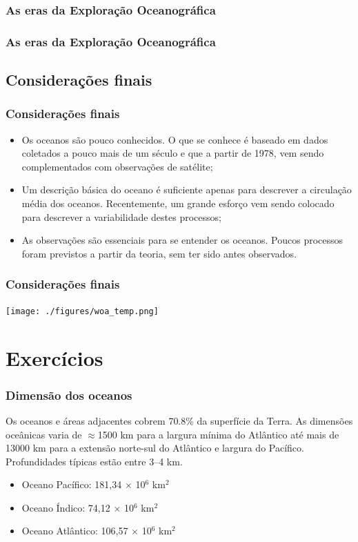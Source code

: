 \begin{frame}
    \frametitle{As eras da Exploração Oceanográfica}
    \centerline{}
\end{frame}

\begin{frame}
    \frametitle{As eras da Exploração Oceanográfica}
    \centerline{}
\end{frame}

\subsection{Considerações finais}
\begin{frame}
    \frametitle{Considerações finais}
\small{
    \begin{itemize}[<+-| alert@+>]
        \item Os oceanos são pouco conhecidos.  O que se conhece é baseado em
              dados coletados a pouco mais de um século e que a partir de 1978,
              vem sendo complementados com observações de satélite;
        \item Um descrição básica do oceano é suficiente apenas para descrever
              a circulação média dos oceanos.  Recentemente, um grande esforço
              vem sendo colocado para descrever a variabilidade destes processos;
        \item As observações são essenciais para se entender os oceanos.
              Poucos processos foram previstos a partir da teoria, sem ter sido antes observados.
    \end{itemize}
}
\end{frame}

\begin{frame}
    \frametitle{Considerações finais}
    \centerline{\texttt{[image: ./figures/woa\_temp.png]}}
\end{frame}

\section{Exercícios}
\begin{frame}
    \frametitle{Dimensão dos oceanos}

    \small{Os oceanos e áreas adjacentes cobrem 70.8\% da superfície da Terra.
    As dimensões oceânicas varia de $\approx$1500 km para a largura mínima do
    Atlântico até mais de 13000 km para a extensão norte-sul do Atlântico e
    largura do Pacífico.  Profundidades típicas estão entre 3--4 km.}

    \begin{itemize}[<+-| alert@+>]
        \item Oceano Pacífico: 181,34 $\times$ 10$^6$ km$^2$
        \item Oceano Índico: 74,12 $\times$ 10$^6$ km$^2$
        \item Oceano Atlântico: 106,57 $\times$ 10$^6$ km$^2$
    \end{itemize}
\end{frame}


